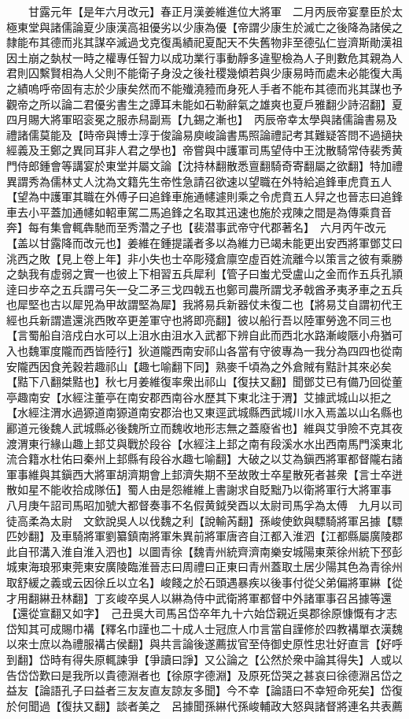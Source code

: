 　　甘露元年【是年六月改元】春正月漢姜維進位大將軍　二月丙辰帝宴羣臣於太極東堂與諸儒論夏少康漢高祖優劣以少康為優【帝謂少康生於滅亡之後降為諸侯之隸能布其德而兆其謀卒滅過戈克復禹績祀夏配天不失舊物非至德弘仁豈濟斯勛漢祖因土崩之埶杖一時之權專任智力以成功業行事動靜多違聖檢為人子則數危其親為人君則囚繫賢相為人父則不能衛子身没之後社稷幾傾若與少康易時而處未必能復大禹之績嗚呼帝固有志於少康矣然而不能殱澆豷而身死人手者不能布其德而兆其謀也予觀帝之所以論二君優劣書生之譚耳未能如石勒辭氣之雄爽也夏戶雅翻少詩沼翻】夏四月賜大將軍昭衮冕之服赤舄副焉【九錫之漸也】　丙辰帝幸太學與諸儒論書易及禮諸儒莫能及【時帝與博士淳于俊論易庾峻論書馬照論禮記考其難疑答問不過擿抉經義及王鄭之異同耳非人君之學也】帝嘗與中護軍司馬望侍中王沈散騎常侍裴秀黄門侍郎鍾會等講宴於東堂并屬文論【沈持林翻散悉亶翻騎奇寄翻屬之欲翻】特加禮異謂秀為儒林丈人沈為文籍先生帝性急請召欲速以望職在外特給追鋒車虎賁五人【望為中護軍其職在外傅子曰追鋒車施通幰遽則乘之令虎賁五人舁之也晉志曰追鋒車去小平蓋加通幰如軺車駕二馬追鋒之名取其迅速也施於戎陳之間是為傳乘賁音奔】每有集會輒犇馳而至秀濳之子也【裴潜事武帝守代郡著名】　六月丙午改元【盖以甘露降而改元也】姜維在鍾提議者多以為維力已竭未能更出安西將軍鄧艾曰洮西之敗【見上卷上年】非小失也士卒彫殘倉廪空虛百姓流離今以策言之彼有乘勝之埶我有虚弱之實一也彼上下相習五兵犀利【管子曰蚩尤受盧山之金而作五兵孔頴逹曰步卒之五兵謂弓矢一殳二矛三戈四戟五也鄭司農所謂戈矛戟酋矛夷矛車之五兵也犀堅也古以犀兕為甲故謂堅為犀】我將易兵新器仗未復二也【將易艾自謂初代王經也兵新謂遣還洮西敗卒更差軍守也將即亮翻】彼以船行吾以陸軍勞逸不同三也【言蜀船自涪戍白水可以上沮水由沮水入武都下辨自此而西北水路漸峻陿小舟猶可入也魏軍度隴而西皆陸行】狄道隴西南安祁山各當有守彼專為一我分為四四也從南安隴西因食羌穀若趣祁山【趣七喻翻下同】熟麥千頃為之外倉賊有黠計其來必矣【黠下八翻桀黠也】秋七月姜維復率衆出祁山【復扶又翻】聞鄧艾已有備乃回從董亭趣南安【水經注董亭在南安郡西南谷水歷其下東北注于渭】艾據武城山以拒之【水經注渭水過獂道南獂道南安郡治也又東逕武城縣西武城川水入焉盖以山名縣也酈道元後魏人武城縣必後魏所立而魏收地形志無之蓋廢省也】維與艾爭險不克其夜渡渭東行緣山趣上邽艾與戰於段谷【水經注上邽之南有段溪水水出西南馬門溪東北流合籍水杜佑曰秦州上邽縣有段谷水趣七喻翻】大破之以艾為鎭西將軍都督隴右諸軍事維與其鎭西大將軍胡濟期會上邽濟失期不至故敗士卒星散死者甚衆【言士卒迸散如星不能收拾成隊伍】蜀人由是怨維維上書謝求自貶黜乃以衛將軍行大將軍事　八月庚午詔司馬昭加號大都督奏事不名假黄鉞癸酉以太尉司馬孚為太傅　九月以司徒高柔為太尉　文欽說吳人以伐魏之利【說輸芮翻】孫峻使欽與驃騎將軍呂據【驃匹妙翻】及車騎將軍劉纂鎮南將軍朱異前將軍唐咨自江都入淮泗【江都縣屬廣陵郡此自邗溝入淮自淮入泗也】以圖青徐【魏青州統齊濟南樂安城陽東萊徐州統下邳彭城東海琅邪東莞東安廣陵臨淮晉志曰周禮曰正東曰青州蓋取土居少陽其色為青徐州取舒緩之義或云因徐丘以立名】峻餞之於石頭遇暴疾以後事付從父弟偏將軍綝【從才用翻綝丑林翻】丁亥峻卒吳人以綝為侍中武衛將軍都督中外諸軍事召呂據等還【還從宣翻又如字】　己丑吳大司馬呂岱卒年九十六始岱親近吳郡徐原慷慨有才志岱知其可成賜巾褠【釋名巾謹也二十成人士冠庶人巾言當自謹修於四教褠單衣漢魏以來士庶以為禮服褠古侯翻】與共言論後遂薦拔官至侍御史原性忠壮好直言【好呼到翻】岱時有得失原輒諫爭【爭讀曰諍】又公論之【公然於衆中論其得失】人或以告岱岱歎曰是我所以貴德淵者也【徐原字德淵】及原死岱哭之甚哀曰徐德淵呂岱之益友【論語孔子曰益者三友友直友諒友多聞】今不幸【論語曰不幸短命死矣】岱復於何聞過【復扶又翻】談者美之　呂據聞孫綝代孫峻輔政大怒與諸督將連名共表薦
